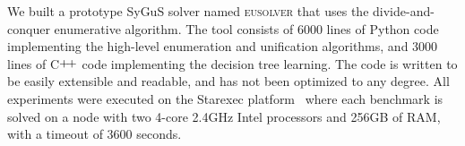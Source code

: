 \documentclass{llncs}
\newcommand{\sygus}{{\sffamily\fontsize{8.5}{10}\selectfont
    SyGuS}\xspace}
\newcommand{\eusolver}{\textsc{eusolver}\xspace}
\begin{document}
We built a prototype \sygus solver named \eusolver that uses the
divide-and-conquer enumerative algorithm.
The tool consists of 6000 lines of Python code implementing the
high-level enumeration and unification algorithms, and 3000 lines of
C$\raisebox{1pt}{+\!+}$ code implementing the decision tree learning.
The code is written to be easily extensible and readable, and has not
been optimized to any degree.
All experiments were executed on the Starexec platform~\cite{starexec}
where each benchmark is solved on a node with two 4-core
2.4GHz Intel processors and 256GB of RAM, with a timeout of $3600$
seconds.

\solvedData
\end{document}
